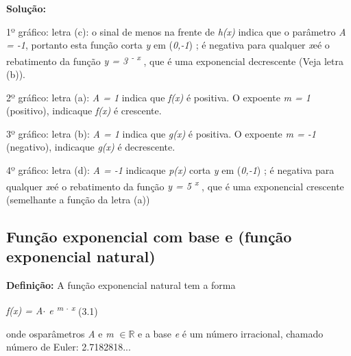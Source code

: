\begin{texemplo}
\textbf{Solução: }

1º gráfico: letra (c): o sinal de menos na frente de \textit{h(x)} indica que o parâmetro \textit{A = -1}, portanto esta função corta \textit{y} em (\textit{0,-1}) ; é negativa para qualquer \textit{x}eé o rebatimento da função   \textit{y = 3\textsuperscript{ - x}} , que é uma exponencial decrescente (Veja letra (b)).

2º gráfico: letra (a): \textit{A = 1} indica que \textit{f(x)} é positiva. O expoente \textit{m = 1 }(positivo),  indicaque  \textit{f(x)} é crescente. 

3º gráfico: letra (b): \textit{A = 1} indica que \textit{g(x)} é positiva. O expoente \textit{m = -1 }(negativo),  indicaque  \textit{g(x)} é decrescente. 

4º gráfico: letra (d): \textit{A = -1 } indicaque  \textit{p(x)} corta \textit{y} em (\textit{0,-1}) ; é negativa para qualquer \textit{x}eé o rebatimento da função   \textit{y = 5\textsuperscript{ x}} , que é uma exponencial crescente (semelhante a função da letra (a)) \qedsymbol{}
\end{texemplo}

\subsection{Função exponencial com base e (função exponencial natural)}

\begin{caixa}
\textbf{Definição:} A função exponencial natural tem a forma

  \textit{f(x) = A$ \cdot $  e \textsuperscript{m $ \cdot $  x}} (3.1)

onde osparâmetros  \textit{A }e \textit{m} $ \in \mathbb{R} $ e a base \textit{e} é um número irracional, chamado  número de Euler: 2.7182818...
\end{caixa}

